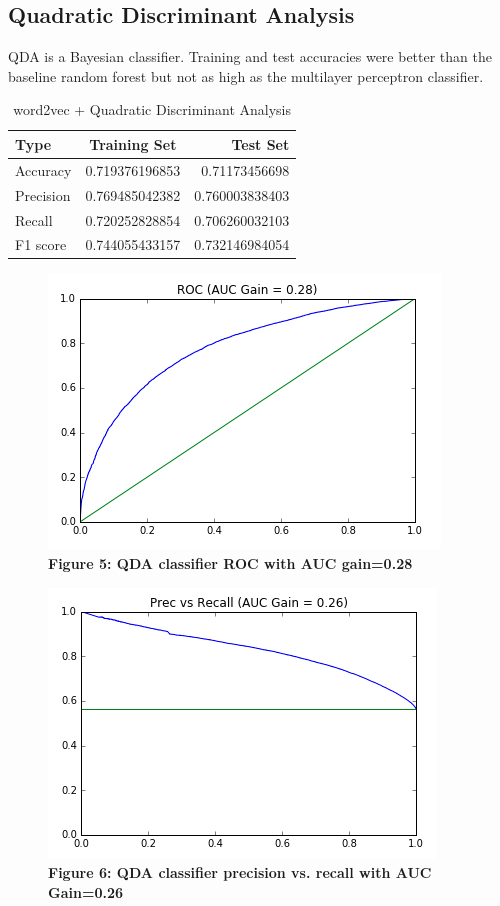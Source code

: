 \documentclass[11pt,a4paper]{article}
\begin{document}
\subsection{Quadratic Discriminant Analysis}
QDA is a Bayesian classifier. Training and test accuracies were better than the baseline random forest but not as high as the multilayer perceptron classifier. 
\begin{table}[h!]
	\begin{center}
		\caption{word2vec + Quadratic Discriminant Analysis}
		\label{tab:table1}
		\begin{tabular}{l|c|r} %
			\textbf{Type} & \textbf{Training Set} & \textbf{Test Set}\\
			\hline
			Accuracy & 0.719376196853 & 0.71173456698 \\
			Precision & 0.769485042382 & 0.760003838403 \\
			Recall & 0.720252828854  & 0.706260032103\\
			F1 score & 0.744055433157 & 0.732146984054
		\end{tabular}
	\end{center}
\end{table}

\begin{figure}[H]
	\centering\includegraphics[scale=0.55]{ROC_qda} 
	\caption{\textbf{Figure 5: QDA classifier ROC with AUC gain=0.28 }}
\end{figure}


\begin{figure}[H]
	\centering\includegraphics[scale=0.55]{prrc_qda} 
	\caption{\textbf{Figure 6: QDA classifier precision vs. recall with AUC Gain=0.26 }}
\end{figure}
\end{document}
